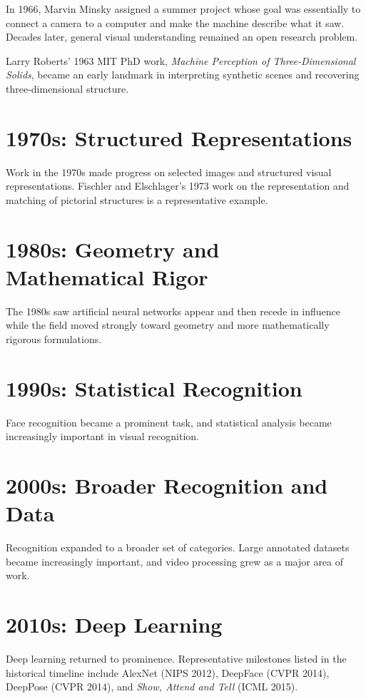 \documentclass[11pt,a4paper,oneside]{report}
\begin{document}
In 1966, Marvin Minsky assigned a summer project whose goal was essentially to connect a camera to a computer and make the machine describe what it saw. Decades later, general visual understanding remained an open research problem.

Larry Roberts' 1963 MIT PhD work, \emph{Machine Perception of Three-Dimensional Solids}, became an early landmark in interpreting synthetic scenes and recovering three-dimensional structure.

\section{1970s: Structured Representations}

Work in the 1970s made progress on selected images and structured visual representations. Fischler and Elschlager's 1973 work on the representation and matching of pictorial structures is a representative example.

\section{1980s: Geometry and Mathematical Rigor}

The 1980s saw artificial neural networks appear and then recede in influence while the field moved strongly toward geometry and more mathematically rigorous formulations.

\section{1990s: Statistical Recognition}

Face recognition became a prominent task, and statistical analysis became increasingly important in visual recognition.

\section{2000s: Broader Recognition and Data}

Recognition expanded to a broader set of categories. Large annotated datasets became increasingly important, and video processing grew as a major area of work.

\section{2010s: Deep Learning}

Deep learning returned to prominence. Representative milestones listed in the historical timeline include AlexNet (NIPS 2012), DeepFace (CVPR 2014), DeepPose (CVPR 2014), and \emph{Show, Attend and Tell} (ICML 2015).
\end{document}
